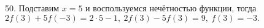 50. Подставим $x=5$ и воспользуемся нечётностью функции, тогда $2f(3)+5f(-3)=2\cdot5-1,\ 2f(3)-5f(3)=9,\ f(3)=-3.$\\

